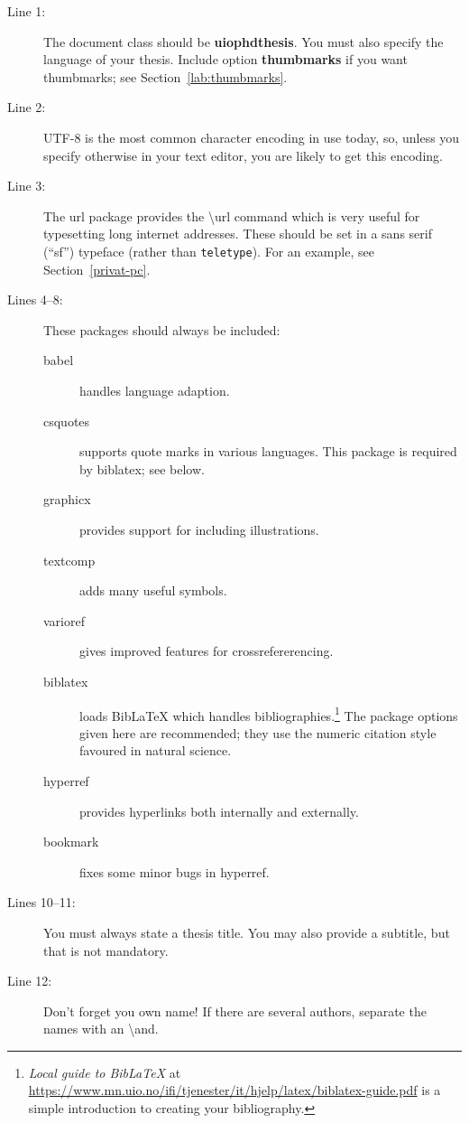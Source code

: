 \documentclass[UKenglish, thumbmarks]{uiophdthesis}
\newcommand{\bsl}{\textbackslash}
\newcommand{\p}[1]{\textsf{#1}}
\newcommand{\pb}[1]{\textbf{\p{#1}}}
\newcommand{\pcmd}[1]{\p{\bsl #1}}
\begin{document}
\begin{description}
\item[Line 1:] The document class should be \pb{uiophdthesis}. You must
  also specify the language of your thesis. Include option \pb{thumbmarks} if
  you want thumbmarks; see Section~\vref{lab:thumbmarks}.  
\item[Line 2:] UTF-8 is the most common character encoding in use
  today, so, unless you specify otherwise in your text editor, you are
  likely to get this encoding.
\item[Line 3:] The \p{url} package provides the \pcmd{url}
  command which is very useful for typesetting long internet
  addresses. These should be set in a \textsf{sans serif} (``sf'') typeface
  (rather than \texttt{teletype}). For an example, see
  Section~\vref{privat-pc}.
\item[Lines 4--8:] These packages should always be included:
  \begin{description}
  \item[\p{babel}] handles language adaption.
  \item[\p{csquotes}] supports quote marks in various languages. This
    package is required by \p{biblatex}; see below.
  \item[\p{graphicx}] provides support for including illustrations.
  \item[\p{textcomp}] adds many useful symbols.
  \item[\p{varioref}] gives improved features for crossrefererencing.
  \item[\p{biblatex}] loads Bib\LaTeX{} which handles
    bibliographies.\footnote{\emph{Local guide to Bib\LaTeX} at
      \url{https://www.mn.uio.no/ifi/tjenester/it/hjelp/latex/biblatex-guide.pdf}
      is a simple introduction to creating your bibliography.}
    The package options given here are recommended; they use the
    numeric citation style favoured in natural science.
  \item[\p{hyperref}] provides hyperlinks both internally and externally.
  \item[\p{bookmark}] fixes some minor bugs in \p{hyperref}.
  \end{description}

\item[Lines 10--11:] You must always state a thesis title. You may also
  provide a subtitle, but that is not mandatory.
\item[Line 12:] Don't forget you own name! If there are several
  authors, separate the names with an \pcmd{and}.


\end{description}
\end{document}
